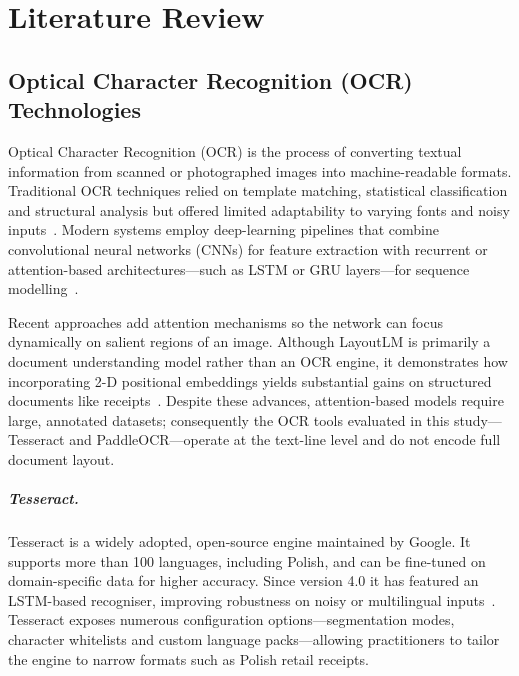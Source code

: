 \documentclass{SGGW-thesis-EN}
\begin{document}
\chapter{Literature Review}

\section{Optical Character Recognition (OCR) Technologies}

Optical Character Recognition (OCR) is the process of converting textual information
from scanned or photographed images into machine-readable formats.
Traditional OCR techniques relied on template matching, statistical classification and
structural analysis but offered limited adaptability to varying fonts and noisy inputs~\cite{ocrsystems}.
Modern systems employ deep-learning pipelines that combine convolutional neural networks
(CNNs) for feature extraction with recurrent or attention-based architectures—such as
LSTM or GRU layers—for sequence modelling~\cite{shi2017e2eseq}.

Recent approaches add attention mechanisms so the network can focus dynamically on
salient regions of an image.
Although LayoutLM is primarily a document understanding model rather than an OCR engine,
it demonstrates how incorporating 2-D positional embeddings yields substantial gains on
structured documents like receipts~\cite{li2020layoutlm}.
Despite these advances, attention-based models require large, annotated datasets;
consequently the OCR tools evaluated in this study—Tesseract and PaddleOCR—operate at the
text-line level and do not encode full document layout.

\paragraph{Tesseract.}
Tesseract is a widely adopted, open-source engine maintained by Google.
It supports more than 100 languages, including Polish, and can be fine-tuned on
domain-specific data for higher accuracy.
Since version 4.0 it has featured an LSTM-based recogniser, improving robustness on
noisy or multilingual inputs~\cite{smith2007overview}.
Tesseract exposes numerous configuration options—segmentation modes, character
whitelists and custom language packs—allowing practitioners to tailor the engine to
narrow formats such as Polish retail receipts.
\end{document}
